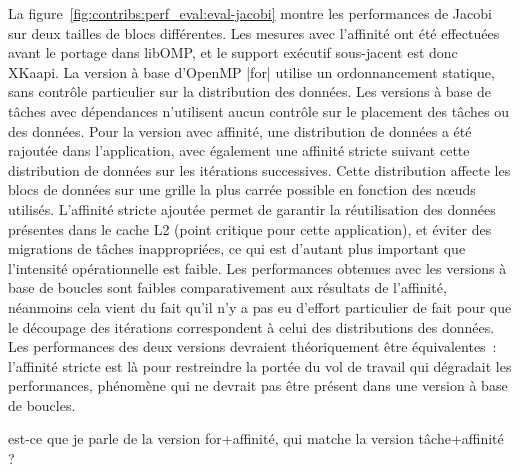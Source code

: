 La figure~\ref{fig:contribs:perf_eval:eval-jacobi} montre les performances de Jacobi sur deux tailles de blocs différentes.
Les mesures avec l'affinité ont été effectuées avant le portage dans libOMP, et le support exécutif sous-jacent est donc XKaapi.
La version à base d'OpenMP |for| utilise un ordonnancement statique, sans contrôle particulier sur la distribution des données.
Les versions à base de tâches avec dépendances n'utilisent aucun contrôle sur le placement des tâches ou des données.
Pour la version avec affinité, une distribution de données a été rajoutée dans l'application, avec également une affinité stricte suivant cette distribution de données sur les itérations successives.
Cette distribution affecte les blocs de données sur une grille la plus carrée possible en fonction des nœuds utilisés.
L'affinité stricte ajoutée permet de garantir la réutilisation des données présentes dans le cache L2 (point critique pour cette application), et éviter des migrations de tâches inappropriées, ce qui est d'autant plus important que l'intensité opérationnelle est faible.
Les performances obtenues avec les versions à base de boucles sont faibles comparativement aux résultats de l'affinité, néanmoins cela vient du fait qu'il n'y a pas eu d'effort particulier de fait pour que le découpage des itérations correspondent à celui des distributions des données.
Les performances des deux versions devraient théoriquement être équivalentes~: l'affinité stricte est là pour restreindre la portée du vol de travail qui dégradait les performances, phénomène qui ne devrait pas être présent dans une version à base de boucles.
\begin{todo}
  est-ce que je parle de la version for+affinité, qui matche la version tâche+affinité ?
\end{todo}
